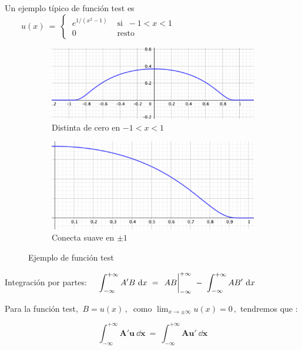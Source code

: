 Un ejemplo típico de función test es $\qquad \displaystyle u(x) \ = \ \begin{cases}  \ e^{1/(x^2-1)} & \text{ si } \ -1<x<1 \\ \ 0 & \text{ resto} \end{cases}$

\begin{figure}[h]
    \begin{subfigure}{0.5\textwidth} %
	\centering
	\includegraphics[width=0.9\linewidth]{imagenes/img36-01.png} %
	\caption{Distinta de cero en $-1<x<1$}
	\label{fig:primer}
    \end{subfigure}
    \begin{subfigure}{0.5\textwidth}
	\centering
	\includegraphics[width=0.9\linewidth]{imagenes/img36-02.png}
	\caption{Conecta suave en $\pm 1$}
	\label{fig:segundo}
    \end{subfigure}
    \caption*{Ejemplo de función test}
    \label{fig:figura}
\end{figure}

Integración por partes: $\quad\displaystyle \int_{-\infty}^{+\infty} A'B\ \dd x \ = \ \eval{AB}_{-\infty}^{+\infty} \ - \ \int_{-\infty}^{+\infty} AB'\ \dd x$

Para la función test, $\ B=u(x)\, , \ $ como $\displaystyle \lim_{x\to \pm \infty} u(x) =0\, , $ tendremos que : 

\begin{equation}
\label{T36partes-test}	
 \displaystyle \boldsymbol{\int_{-\infty}^{+\infty}A'u \ \dd x \ = \ \int_{-\infty}^{+\infty} Au'\ \dd x }
\end{equation}




